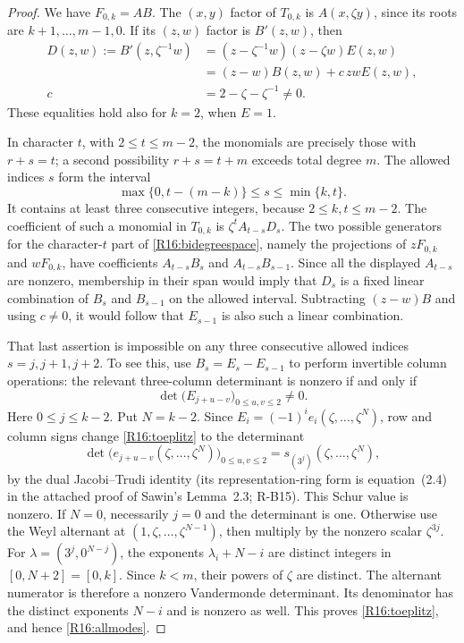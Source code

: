 \documentclass[11pt,a4paper]{article}
\theoremstyle{definition}\newtheorem{definition}{Definition}
\begin{document}
\begin{proof}
We have $F_{0,k}=AB$. The $(x,y)$ factor of $T_{0,k}$ is
$A(x,\zeta y)$, since its roots are $k+1,\ldots,m-1,0$.
If its $(z,w)$ factor is $B'(z,w)$, then
\[
 \begin{aligned}
 D(z,w):=B'(z,\zeta^{-1}w)
   &=(z-\zeta^{-1}w)(z-\zeta w)E(z,w)\\
   &=(z-w)B(z,w)+c\,zwE(z,w),\\
 c&=2-\zeta-\zeta^{-1}\ne0.
 \end{aligned}
\]
These equalities hold also for $k=2$, when $E=1$.

In character $t$, with $2\leq t\leq m-2$, the monomials
are precisely those with $r+s=t$; a second possibility
$r+s=t+m$ exceeds total degree $m$.
The allowed indices $s$ form the interval
\[
 \max\{0,t-(m-k)\}\leq s\leq\min\{k,t\}.
\]
It contains at least three consecutive integers, because
$2\leq k,t\leq m-2$.
The coefficient of such a monomial in $T_{0,k}$ is
$\zeta^t A_{t-s}D_s$. The two possible generators for
the character-$t$ part of \eqref{R16:bidegreespace}, namely
the projections of $zF_{0,k}$ and $wF_{0,k}$, have
coefficients $A_{t-s}B_s$ and $A_{t-s}B_{s-1}$.
Since all the displayed $A_{t-s}$ are nonzero, membership
in their span would imply that $D_s$ is a fixed linear
combination of $B_s$ and $B_{s-1}$ on the allowed interval.
Subtracting $(z-w)B$ and using $c\ne0$, it would follow
that $E_{s-1}$ is also such a linear combination.

That last assertion is impossible on any three consecutive
allowed indices $s=j,j+1,j+2$. To see this, use
$B_s=E_s-E_{s-1}$ to perform invertible column operations:
the relevant three-column determinant is nonzero if and
only if
\begin{equation}\label{R16:toeplitz}
 \det\bigl(E_{j+u-v}\bigr)_{0\leq u,v\leq2}\ne0.
\end{equation}
Here $0\leq j\leq k-2$. Put $N=k-2$.
Since $E_i=(-1)^i e_i(\zeta,\ldots,\zeta^N)$, row and
column signs change \eqref{R16:toeplitz} to the determinant
\[
 \det\bigl(e_{j+u-v}(\zeta,\ldots,\zeta^N)\bigr)_{0\leq u,v\leq2}
   =s_{(3^j)}(\zeta,\ldots,\zeta^N),
\]
by the dual Jacobi--Trudi identity (its representation-ring
form is equation~(2.4) in the attached proof of Sawin's Lemma~2.3;
R-B15). This Schur value is nonzero. If $N=0$, necessarily $j=0$ and the determinant
is one. Otherwise use the Weyl alternant at
$(1,\zeta,\ldots,\zeta^{N-1})$, then multiply by the
nonzero scalar $\zeta^{3j}$. For
$\lambda=(3^j,0^{N-j})$, the exponents
$\lambda_i+N-i$ are distinct integers in $[0,N+2]=[0,k]$.
Since $k<m$, their powers of $\zeta$ are distinct. The
alternant numerator is therefore a nonzero Vandermonde
determinant. Its denominator has the distinct exponents
$N-i$ and is nonzero as well. This proves
\eqref{R16:toeplitz}, and hence \eqref{R16:allmodes}.


\end{proof}
\end{document}
